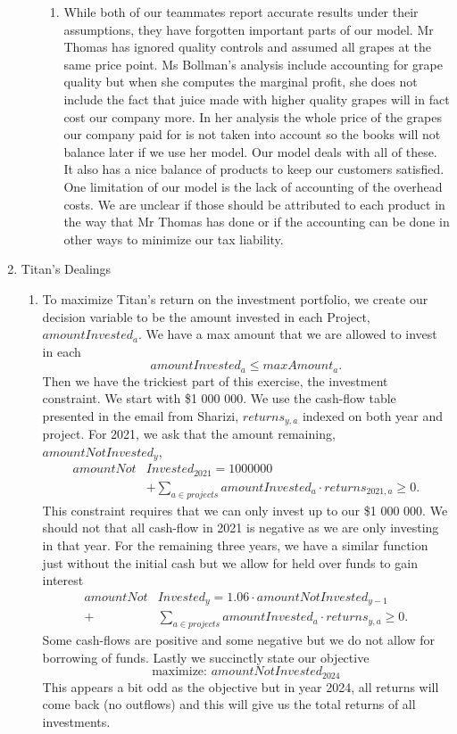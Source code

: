 \documentclass[11pt]{article}
\begin{document}
\begin{enumerate}
\begin{enumerate}
\begin{enumerate}
\item While both of our teammates report accurate results under their assumptions, they have forgotten important parts of our model.  Mr Thomas has ignored quality controls and assumed all grapes at the same price point.  Ms Bollman's analysis include accounting for grape quality but when she computes the marginal profit, she does not include the fact that juice made with higher quality grapes will in fact cost our company more.  In her analysis the whole price of the grapes our company paid for is not taken into account so the books will not balance later if we use her model.  Our model deals with all of these.  It also has a nice balance of products to keep our customers satisfied.  One limitation of our model is the lack of accounting of the overhead costs.  We are unclear if those should be attributed to each product in the way that Mr Thomas has done or if the accounting can be done in other ways to minimize our tax liability.
\end{enumerate}
\end{enumerate}
\item Titan's Dealings
\begin{enumerate}
\item To maximize Titan's return on the investment portfolio, we create our decision variable to be the amount invested in each Project, $amountInvested_a$.  We have a max amount that we are allowed to invest in each
\[
amountInvested_a \leq maxAmount_a.
\]
Then we have the trickiest part of this exercise, the investment constraint.  We start with \$1 000 000.  We use the cash-flow table presented in the email from Sharizi, $returns_{y,a}$ indexed on both year and project.  For 2021, we ask that the amount remaining, $amountNotInvested_y$,
\begin{align*}
amountNot&Invested_{2021} = 1 000 000\\
& + \displaystyle\sum_{a \in projects} amountInvested_a\cdot returns_{2021,a}\geq 0.
\end{align*}
This constraint requires that we can only invest up to our \$1 000 000.  We should not that all cash-flow in 2021 is negative as we are only investing in that year.  For the remaining three years, we have a similar function just without the initial cash but we allow for held over funds to gain interest
\begin{align*}
amountNot&Invested_y = 1.06 \cdot amountNotInvested_{y-1}\\
+&\displaystyle\sum_{a \in projects} amountInvested_a\cdot returns_{y,a}\geq 0.
\end{align*}
Some cash-flows are positive and some negative but we do not allow for borrowing of funds.  Lastly we succinctly state our objective
\[
\text{maximize: }amountNotInvested_{2024}
\]
This appears a bit odd as the objective but in year 2024, all returns will come back (no outflows) and this will give us the total returns of all investments.


\end{enumerate}
\end{enumerate}
\end{document}
